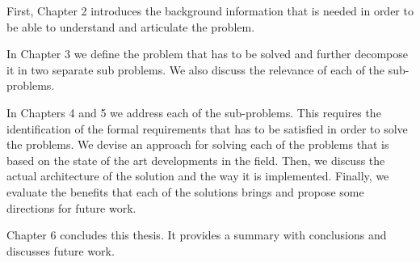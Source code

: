 First, Chapter 2 introduces the background information that is needed in order to be able to understand and articulate the problem.

In Chapter 3 we define the problem that has to be solved and further decompose it in two separate sub problems. We also discuss the relevance of each of the sub-problems.

In Chapters 4 and 5 we address each of the sub-problems. This requires the identification of the formal requirements that has to be satisfied in order to solve the problems. We devise an approach for solving each of the problems that is based on the state of the art developments in the field. Then, we discuss the actual architecture of the solution and the way it is implemented. Finally, we evaluate the benefits that each of the solutions brings and propose some directions for future work. 

Chapter 6 concludes this thesis. It provides a summary with conclusions and discusses future work.
